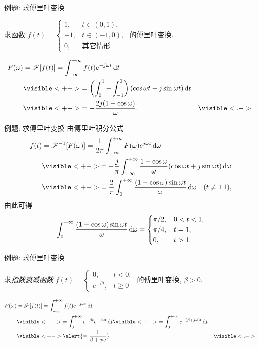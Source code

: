 \begin{frame}{例题: 求傅里叶变换}
\begin{example}
求函数 $f(t)=
	\begin{cases}
		1,&t\in(0,1),\\
		-1,&t\in(-1,0),\\
		0,&\text{其它情形}
	\end{cases}$ 的傅里叶变换.
\end{example}
\begin{solution}
\vspace{-\baselineskip}
\begin{align*}
F(\omega)&=\msf[f(t)]=\int_{-\infty}^{+\infty}f(t)e^{-j\omega t}\diff t\\
&\visible<+->{=\left(\int_0^1-\int_{-1}^0\right)(\cos{\omega t}-j\sin{\omega t})\diff t}\\
&\visible<+->{=-\frac{2j(1-\cos\omega)}\omega.}&\visible<.->{}
\end{align*}
\end{solution}
\end{frame}


\begin{frame}{例题: 求傅里叶变换}
\onslide<+->
由傅里叶积分公式
\begin{align*}
f(t)&=\msf^{-1}[F(\omega)]=\frac1{2\pi}\int_{-\infty}^{+\infty}F(\omega)e^{j\omega t}\diff\omega\\
&\visible<+->{=-\frac j\pi\int_{-\infty}^{+\infty}\frac{1-\cos\omega}\omega(\cos{\omega t}+j\sin{\omega t})\diff\omega}\\
&\visible<+->{=\frac2\pi\int_0^{+\infty}\frac{(1-\cos\omega)\sin{\omega t}}\omega\diff\omega\quad(t\neq\pm1),}
\end{align*}
\onslide<+->
由此可得
\[\int_0^{+\infty}\frac{(1-\cos\omega)\sin{\omega t}}\omega\,\mathrm{d}\omega=
	\begin{cases}
		\pi/2,&0<t<1,\\
		\pi/4,&t=1,\\
		0,&t>1.	
	\end{cases}\]
\end{frame}


\begin{frame}{例题: 求傅里叶变换}
\begin{example}
求\emph{指数衰减函数} $f(t)=
	\begin{cases}
		0,&t<0,\\
		e^{-\beta t},&t\ge 0
	\end{cases}$ 的傅里叶变换, $\beta>0$.
\end{example}
\begin{solution}
\vspace{-\baselineskip}
\begin{align*}
F(\omega)&=\msf[f(t)]=\int_{-\infty}^{+\infty}f(t)e^{-j\omega t}\diff t\\
&\visible<+->{=\int_0^{+\infty}e^{-\beta t}e^{-j\omega t}\diff t}
\visible<+->{=\int_0^{+\infty}e^{-(\beta+j\omega)t}\diff t}\\
&\visible<+->{\alert{=\frac1{\beta+j\omega}}.}&\visible<.->{}
\end{align*}
\end{solution}
\end{frame}


